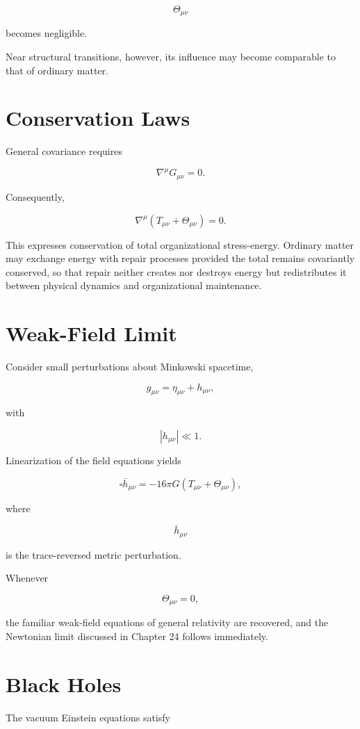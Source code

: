 \documentclass[11pt,oneside]{book}
\numberwithin{equation}{chapter}
\theoremstyle{definition}
\theoremstyle{plain}
\begin{document}
\[
\Theta_{\mu\nu}
\]

becomes negligible.

Near structural transitions, however, its influence may become comparable to
that of ordinary matter.

\section{Conservation Laws}

General covariance requires

\[
\nabla^\mu
G_{\mu\nu}
=
0.
\]

Consequently,

\[
\nabla^\mu
\left(
T_{\mu\nu}
+
\Theta_{\mu\nu}
\right)
=
0.
\]

This expresses conservation of total organizational stress-energy. Ordinary matter may exchange energy with repair processes provided the total remains covariantly conserved, so that repair neither creates nor destroys energy but redistributes it between physical dynamics and organizational maintenance.

\section{Weak-Field Limit}

Consider small perturbations about Minkowski spacetime,

\[
g_{\mu\nu}
=
\eta_{\mu\nu}
+
h_{\mu\nu},
\]

with

\[
|h_{\mu\nu}|
\ll
1.
\]

Linearization of the field equations yields

\[
\square
\bar h_{\mu\nu}
=
-16\pi G
\left(
T_{\mu\nu}
+
\Theta_{\mu\nu}
\right),
\]

where

\[
\bar h_{\mu\nu}
\]

is the trace-reversed metric perturbation.

Whenever

\[
\Theta_{\mu\nu}=0,
\]

the familiar weak-field equations of general relativity are recovered, and the Newtonian limit discussed in Chapter 24 follows immediately.

\section{Black Holes}

The vacuum Einstein equations satisfy
\end{document}
